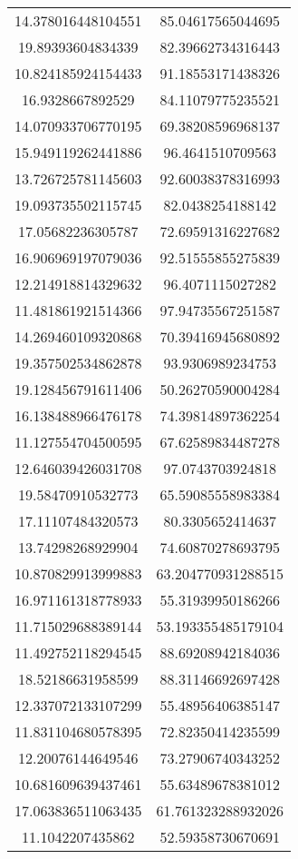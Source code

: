 \begin{table}
\begin{tabular}{cc}
14.378016448104551 & 85.04617565044695 \\
19.89393604834339 & 82.39662734316443 \\
10.824185924154433 & 91.18553171438326 \\
16.9328667892529 & 84.11079775235521 \\
14.070933706770195 & 69.38208596968137 \\
15.949119262441886 & 96.4641510709563 \\
13.726725781145603 & 92.60038378316993 \\
19.093735502115745 & 82.0438254188142 \\
17.05682236305787 & 72.69591316227682 \\
16.906969197079036 & 92.51555855275839 \\
12.214918814329632 & 96.4071115027282 \\
11.481861921514366 & 97.94735567251587 \\
14.269460109320868 & 70.39416945680892 \\
19.357502534862878 & 93.9306989234753 \\
19.128456791611406 & 50.26270590004284 \\
16.138488966476178 & 74.39814897362254 \\
11.127554704500595 & 67.62589834487278 \\
12.646039426031708 & 97.0743703924818 \\
19.58470910532773 & 65.59085558983384 \\
17.11107484320573 & 80.3305652414637 \\
13.74298268929904 & 74.60870278693795 \\
10.870829913999883 & 63.204770931288515 \\
16.971161318778933 & 55.31939950186266 \\
11.715029688389144 & 53.193355485179104 \\
11.492752118294545 & 88.69208942184036 \\
18.52186631958599 & 88.31146692697428 \\
12.337072133107299 & 55.48956406385147 \\
11.831104680578395 & 72.82350414235599 \\
12.20076144649546 & 73.27906740343252 \\
10.681609639437461 & 55.63489678381012 \\
17.063836511063435 & 61.761323288932026 \\
11.1042207435862 & 52.59358730670691 \\

\end{tabular}
\end{table}
